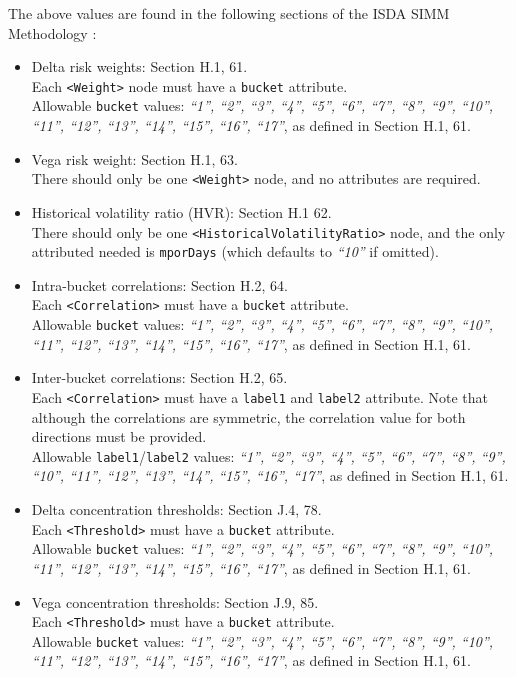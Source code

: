 The above values are found in the following sections of the ISDA SIMM Methodology \cite{SIMM2.5A}:
\begin{itemize}
  \item Delta risk weights: Section H.1, 61. \\
    Each {\tt <Weight>} node must have a {\tt bucket} attribute.\\
    Allowable {\tt bucket} values: \emph{``1'', ``2'', ``3'', ``4'', ``5'', ``6'', ``7'', ``8'', ``9'', ``10'', ``11'', ``12'', ``13'', ``14'', ``15'', ``16'', ``17''}, as defined in Section H.1, 61.
  \item Vega risk weight: Section H.1, 63. \\
    There should only be one {\tt <Weight>} node, and no attributes are required.
  \item Historical volatility ratio (HVR): Section H.1 62. \\
    There should only be one {\tt <HistoricalVolatilityRatio>} node, and the only attributed needed is {\tt mporDays} (which defaults to \emph{``10''} if omitted).
  \item Intra-bucket correlations: Section H.2, 64. \\
    Each {\tt <Correlation>} must have a {\tt bucket} attribute. \\
    Allowable {\tt bucket} values: \emph{``1'', ``2'', ``3'', ``4'', ``5'', ``6'', ``7'', ``8'', ``9'', ``10'', ``11'', ``12'', ``13'', ``14'', ``15'', ``16'', ``17''}, as defined in Section H.1, 61.
  \item Inter-bucket correlations: Section H.2, 65. \\
    Each {\tt <Correlation>} must have a {\tt label1} and {\tt label2} attribute. Note that although the correlations
    are symmetric, the correlation value for both directions must be provided. \\
    Allowable {\tt label1}/{\tt label2} values: \emph{``1'', ``2'', ``3'', ``4'', ``5'', ``6'', ``7'', ``8'', ``9'', ``10'', ``11'', ``12'', ``13'', ``14'', ``15'', ``16'', ``17''}, as defined in Section H.1, 61.
  \item Delta concentration thresholds: Section J.4, 78. \\
    Each {\tt <Threshold>} must have a {\tt bucket} attribute. \\
    Allowable {\tt bucket} values: \emph{``1'', ``2'', ``3'', ``4'', ``5'', ``6'', ``7'', ``8'', ``9'', ``10'', ``11'', ``12'', ``13'', ``14'', ``15'', ``16'', ``17''}, as defined in Section H.1, 61.
  \item Vega concentration thresholds: Section J.9, 85. \\
    Each {\tt <Threshold>} must have a {\tt bucket} attribute. \\
    Allowable {\tt bucket} values: \emph{``1'', ``2'', ``3'', ``4'', ``5'', ``6'', ``7'', ``8'', ``9'', ``10'', ``11'', ``12'', ``13'', ``14'', ``15'', ``16'', ``17''}, as defined in Section H.1, 61.
\end{itemize}

